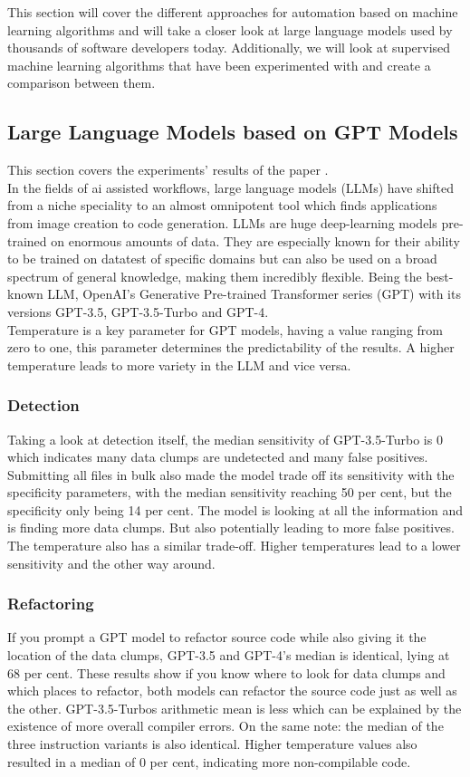 This section will cover the different approaches for automation based on machine learning algorithms and will take a closer look at large language models used by thousands of software developers today. Additionally, we will look at supervised machine learning algorithms that have been experimented with and create a comparison between them.
\subsection{Large Language Models based on GPT Models}
This section covers the experiments' results of the paper \cite[AI-Driven Refactoring: A Pipeline for Identifying and Correcting Data Clumps in Git Repositories]{baumgartner2024aidriven}.\\
In the fields of ai assisted workflows, large language models (LLMs) have shifted from a niche speciality to an almost omnipotent tool which finds applications from image creation to code generation.\cite{meyer2024ai} LLMs are huge deep-learning models pre-trained on enormous amounts of data. They are especially known for their ability to be trained on datatest of specific domains but can also be used on a broad spectrum of general knowledge, making them incredibly flexible. \cite{baumgartner2024aidriven}
Being the best-known LLM, OpenAI's Generative Pre-trained Transformer series (GPT) with its versions GPT-3.5, GPT-3.5-Turbo and GPT-4.\\
Temperature is a key parameter for GPT models, having a value ranging from zero to one, this parameter determines the predictability of the results.
A higher temperature leads to more variety in the LLM and vice versa.
\subsubsection{Detection}
Taking a look at detection itself, the median sensitivity of GPT-3.5-Turbo is 0 which indicates many data clumps are undetected and many false positives.
Submitting all files in bulk also made the model trade off its sensitivity with the specificity parameters, with the median sensitivity reaching 50 per cent, but the specificity only being 14 per cent.
The model is looking at all the information and is finding more data clumps. But also potentially leading to more false positives.
The temperature also has a similar trade-off. Higher temperatures lead to a lower sensitivity and the other way around.
\subsubsection{Refactoring}
If you prompt a GPT model to refactor source code while also giving it the location of the data clumps, GPT-3.5 and GPT-4's median is identical, lying at 68 per cent.
These results show if you know where to look for data clumps and which places to refactor, both models can refactor the source code just as well as the other.
GPT-3.5-Turbos arithmetic mean is less which can be explained by the existence of more overall compiler errors.
On the same note: the median of the three instruction variants is also identical.
Higher temperature values also resulted in a median of 0 per cent, indicating more non-compilable code.
